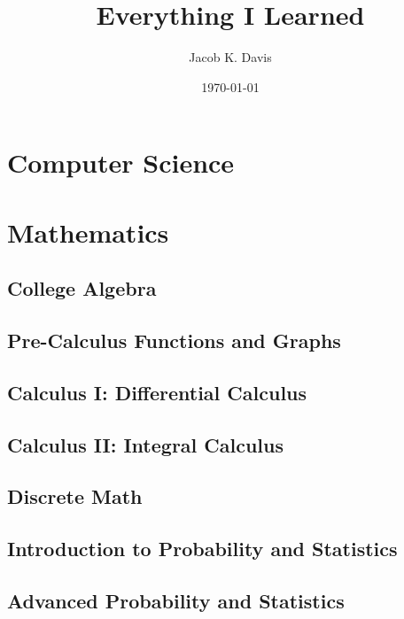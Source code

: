 \documentclass[11pt]{book}
\begin{document}
\title{Everything I Learned}
\author{Jacob K. Davis}
\date{\today}
\maketitle



\tableofcontents


\part{Computer Science}













\part{Mathematics}
\chapter{College Algebra}
\chapter{Pre-Calculus Functions and Graphs}
\chapter{Calculus I: Differential Calculus}
\chapter{Calculus II: Integral Calculus}
\chapter{Discrete Math}
\chapter{Introduction to Probability and Statistics}
\chapter{Advanced Probability and Statistics}
\end{document}
